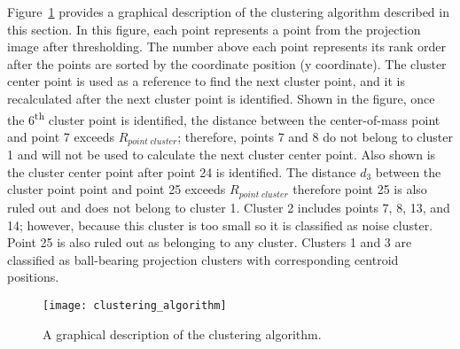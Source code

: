 Figure~\ref{fig:clustering_algorithm} provides a graphical description of the clustering algorithm described in this section.  In this figure, each point represents a point from the projection image after thresholding.  The number above each point represents its rank order after the points are sorted by the coordinate position (y coordinate).  The cluster center point is used as a reference to find the next cluster point, and it is recalculated after the next cluster point is identified.  Shown in the figure, once the 6\textsuperscript{th} cluster point is identified, the distance between the center-of-mass point and point 7 exceeds $R_{point \; cluster}$; therefore, points 7 and 8 do not belong to cluster 1 and will not be used to calculate the next cluster center point.  Also shown is the cluster center point after point 24 is identified. The distance $d_3$ between the cluster point point and point 25 exceeds $R_{point \; cluster}$ therefore point 25 is also ruled out and does not belong to cluster 1.  Cluster 2 includes points 7, 8, 13, and 14; however, because this cluster is too small so it is classified as noise cluster.  Point 25 is also ruled out as belonging to any cluster.  Clusters 1 and 3 are classified as ball-bearing projection clusters with corresponding centroid positions.
%
\begin{figure}[ht]
\centering
\texttt{[image: clustering\_algorithm]}
\caption{A graphical description of the clustering algorithm.  }
\label{fig:clustering_algorithm}
\end{figure}



